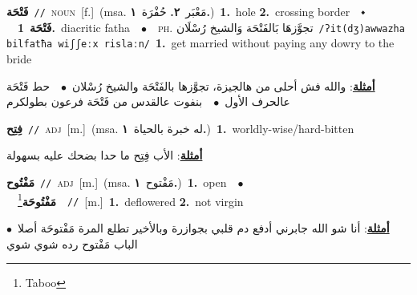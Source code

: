 \documentclass[10pt,a4paper,twoside]{article} %
\begin{document}
\begin{multicols}{2}
{{{{\setlength\topsep{0pt}\textbf{\foreignlanguage{arabic}{فَتْحَة}}\ {\color{gray}\texttt{//}\color{black}}\ \textsc{noun}\ [f.]\ \color{gray}(msa. \foreignlanguage{arabic}{مَعْبَر}~\foreignlanguage{arabic}{\textbf{٢.}}  \foreignlanguage{arabic}{حُفْرَة}~\foreignlanguage{arabic}{\textbf{١.}})\color{black}\ \textbf{1.}~hole  \textbf{2.}~crossing border\ \ $\smblkdiamond$\ \ \setlength\topsep{0pt}\textbf{\foreignlanguage{arabic}{فَتْحَة}}\ \textbf{1.}~diacritic fatha\ \ $\bullet$\ \ \textsc{ph.} \color{gray} \foreignlanguage{arabic}{تجوَّزهَا بَالفَتْحَة وَالشيخ رُسْلَان}\color{black}\ {\color{gray}\texttt{/{\sffamily ʔit(dʒ)awwazha bilfatħa wiʃʃeːx rislaːn}/}\color{black}}\ \textbf{1.}~get married without paying any dowry to the bride\  \begin{flushright}\color{gray}\foreignlanguage{arabic}{\textbf{\underline{\foreignlanguage{arabic}{أمثلة}}}: والله فش أحلى من هالجيزة، تجوَّزها بالفَتْحَة والشيخ رُسْلان\ $\bullet$\ \  حط فَتْحَة عالحرف الأول\ $\bullet$\ \  بنفوت عالقدس من فَتْحَة فرعون بطولكرم}\end{flushright}\color{black}} \vspace{2mm}

{\setlength\topsep{0pt}\textbf{\foreignlanguage{arabic}{فِتِح}}\ {\color{gray}\texttt{//}\color{black}}\ \textsc{adj}\ [m.]\ \color{gray}(msa. \foreignlanguage{arabic}{له خبرة بالحياة}~\foreignlanguage{arabic}{\textbf{١.}})\color{black}\ \textbf{1.}~worldly-wise/hard-bitten\  \begin{flushright}\color{gray}\foreignlanguage{arabic}{\textbf{\underline{\foreignlanguage{arabic}{أمثلة}}}: الأب فِتِح ما حدا بضحك عليه بسهولة}\end{flushright}\color{black}} \vspace{2mm}

{\setlength\topsep{0pt}\textbf{\foreignlanguage{arabic}{مَفْتُوح}}\ {\color{gray}\texttt{//}\color{black}}\ \textsc{adj}\ [m.]\ \color{gray}(msa. \foreignlanguage{arabic}{مَفْتوح}~\foreignlanguage{arabic}{\textbf{١.}})\color{black}\ \textbf{1.}~open\ \ $\bullet$\ \ \setlength\topsep{0pt}\textbf{\foreignlanguage{arabic}{مَفْتُوحَة}}\footnote{Taboo}\ \ {\color{gray}\texttt{//}\color{black}}\ [m.]\ \textbf{1.}~deflowered  \textbf{2.}~not virgin\  \begin{flushright}\color{gray}\foreignlanguage{arabic}{\textbf{\underline{\foreignlanguage{arabic}{أمثلة}}}: أنا شو الله جابرني أدفع دم قلبي بجوازرة وبالأخير تطلع المرة مَفْتوحَة أصلا\ $\bullet$\ \  الباب مَفْتوح رده شوي شوي}\end{flushright}\color{black}} \vspace{2mm}

}}}
\end{multicols}
\end{document}
